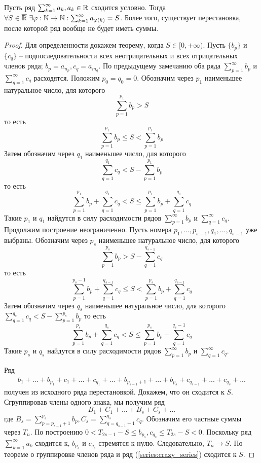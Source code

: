 \begin{Thm}
	Пусть ряд $\sum_{k=1}^{\infty} a_k, a_k \in \mathbb{R}$ сходится условно. Тогда $\forall S \in \overline{\mathbb{R}} \ \exists \varphi : \mathbb{N} \to \mathbb{N} : \sum_{k=1}^{\infty} a_{\varphi(k)} = S$.
	Более того, существует перестановка, после которой ряд вообще не будет иметь суммы. 
\end{Thm}

\begin{proof}
	Для определенности докажем теорему, когда $S \in [0, +\infty)$.
	Пусть $\{b_p\}$ и $\{c_q\}$ -- подпоследовательности всех неотрицательных и всех отрицательных членов ряда; $b_p = a_{n_p}, c_q = a_{m_q}$. 
	По предыдущему замечанию оба ряда $\sum_{p=1}^{\infty} b_p$ и $\sum_{q=1}^{\infty} c_q$ расходятся. 
	Положим $p_0 = q_0 = 0$.  Обозначим через $p_1$ наименьшее натуральное число, для которого
	\[\sum_{p=1}^{p_1} b_p > S\]
	то есть
	\[\sum_{p=1}^{p_1} b_p \leqslant S < \sum_{p=1}^{p_1} b_p\]
	Затем обозначим через $q_1$ наименьшее число, для которого
	\[\sum_{q=1}^{q_1} c_q < S - \sum_{p=1}^{p_1} b_p\]
	то есть
	\[\sum_{p=1}^{p_1}b_p + \sum_{q=1}^{q_1} c_q < S \leqslant \sum_{p=1}^{p_1} b_p + \sum_{q=1}^{q_1} c_q \]
	Такие $p_1$ и $q_1$ найдутся в силу расходимости рядов $\sum_{p=1}^{\infty} b_p$ и $\sum_{q=1}^{\infty} c_q$.
	Продолжим построение неограниченно. Пусть номера $p_1, ..., p_{s - 1}, q_1, ..., q_{s - 1}$ уже выбраны. Обозначим через $p_s$ наименьшее натуральное число, для которого
	\[\sum_{p=1}^{p_s} b_p > S - \sum_{q=1}^{q_{s - 1}} c_q\]
	то есть
	\[\sum_{p=1}^{p_s - 1} b_p + \sum_{q=1}^{q_{s - 1}} c_q \leqslant S < \sum_{p=1}^{p_s} b_p + \sum_{q=1}^{q_{s - 1}} c_q\]
	Затем обозначим через $q_s$ наименьшее натуральное число, для которого $\sum_{q=1}^{q_s} c_q < S - \sum_{p=1}^{p_s} b_p$
	то есть
	\[\sum_{p=1}^{p_s} b_p + \sum_{q=1}^{q_s} c_q < S \leqslant \sum_{p=1}^{p_s} b_p + \sum_{q=1}^{q_s - 1} c_q\]
	Такие $p_s$ и $q_s$ найдутся в силу расходимости рядов $\sum_{p=1}^{\infty} b_p$ и $\sum_{q=1}^{\infty} c_q$.
	
	Ряд 
	\begin{multline}\label{series:crazy_series}
		b_1 + ... + b_{p_1} + c_1 + ... + c_{q_1} + ... + b_{p_{s - 1} + 1} + ... + b_{p_s} + c_{q_{s - 1}} + ... + c_{q_s} + ...
	\end{multline}
	получен из исходного ряда перестановкой. Докажем, что он сходится к $S$. Сгруппировав члены одного знака, мы получим ряд
	\[B_1 + C_1 + ... + B_s + C_s + ...\]
	где $B_s = \sum_{p=p_{s - 1} + 1}^{p_s} b_p, C_s = \sum_{q=q_{s - 1} + 1}^{q_s} c_q$. Обозначим его частные суммы через $T_n$.
	По построению $0 < T_{2s - 1} - S \leqslant b_{p_s}, c_{q_s} \leqslant T_{2s} - S < 0$. Поскольку ряд $\sum_{k=1}^{\infty} a_k$ сходится к, $b_{p_s}$ и $c_{q_s}$ стремятся к нулю.
	Следовательно, $T_n \to S$. По теореме о группировке членов ряда и ряд (\ref{series:crazy_series}) сходится к $S$. 
\end{proof}

